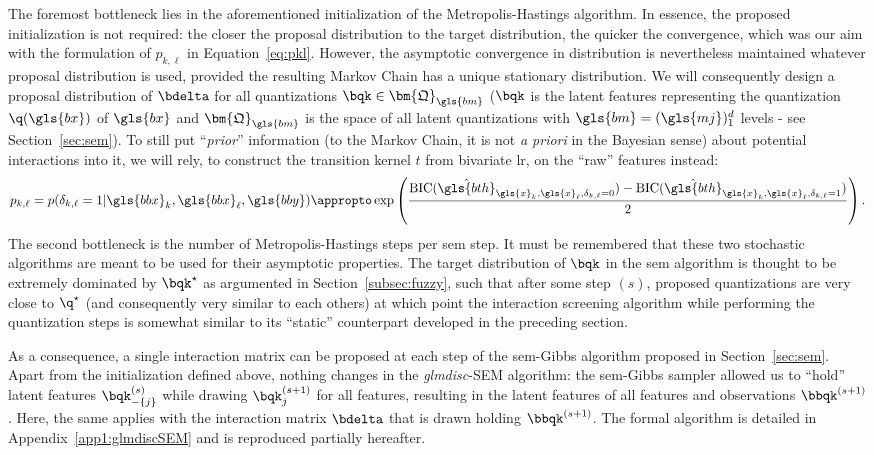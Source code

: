 The foremost bottleneck lies in the aforementioned initialization of the Metropolis-Hastings algorithm. In essence, the proposed initialization is not required: the closer the proposal distribution to the target distribution, the quicker the convergence, which was our aim with the formulation of $p_{k,\ell}$ in Equation~\eqref{eq:pkl}. However, the asymptotic convergence in distribution is nevertheless maintained whatever proposal distribution is used, provided the resulting Markov Chain has a unique stationary distribution. We will consequently design a proposal distribution of $\bdelta$ for all quantizations $\bqk \in \bm{\mathfrak{Q}}_{\gls{bm}}$ ($\bqk$ is the latent features representing the quantization $\q(\gls{bx})$ of $\gls{bx}$ and $\bm{\mathfrak{Q}}_{\gls{bm}}$ is the space of all latent quantizations with $\gls{bm} = (\gls{mj})_1^d$ levels - see Section~\ref{sec:sem}). To still put ``\textit{prior}'' information (to the Markov Chain, it is not \textit{a priori} in the Bayesian sense) about potential interactions into it, we will rely, to construct the transition kernel $t$ from bivariate \gls{lr}, on the ``raw'' features instead:
\begin{equation} \label{eq:pklnew}
p_{k,\ell} = p(\delta_{k,\ell} = 1 | \gls{bbx}_k, \gls{bbx}_\ell, \gls{bby}) \appropto \exp \left( \frac{\text{BIC}(\hat{\gls{bth}}_{\gls{x}_k,\gls{x}_\ell,\delta_{k,\ell}=0}) - \text{BIC}(\hat{\gls{bth}}_{\gls{x}_k,\gls{x}_\ell,\delta_{k,\ell}=1})}{2} \right).
\end{equation}
The second bottleneck is the number of Metropolis-Hastings steps per \gls{sem} step. It must be remembered that these two stochastic algorithms are meant to be used for their asymptotic properties. The target distribution of $\bqk$ in the \gls{sem} algorithm is thought to be extremely dominated by $\bqk^\star$ as argumented in Section~\ref{subsec:fuzzy}, such that after some step $(s)$, proposed quantizations are very close to $\q^\star$ (and consequently very similar to each others) at which point the interaction screening algorithm while performing the quantization steps is somewhat similar to its ``static'' counterpart developed in the preceding section.

As a consequence, a single interaction matrix can be proposed at each step of the \gls{sem}-Gibbs algorithm proposed in Section~\ref{sec:sem}. Apart from the initialization defined above, nothing changes in the \textit{glmdisc}-SEM algorithm: the \gls{sem}-Gibbs sampler allowed us to ``hold'' latent features $\bqk_{-\{j\}}^{(s)}$ while drawing $\bqk_{j}^{(s+1)}$ for all features, resulting in the latent features of all features and observations $\bbqk^{(s+1)}$. Here, the same applies with the interaction matrix $\bdelta$ that is drawn holding $\bbqk^{(s+1)}$. The formal algorithm is detailed in Appendix~\ref{app1:glmdiscSEM} and is reproduced partially hereafter.

